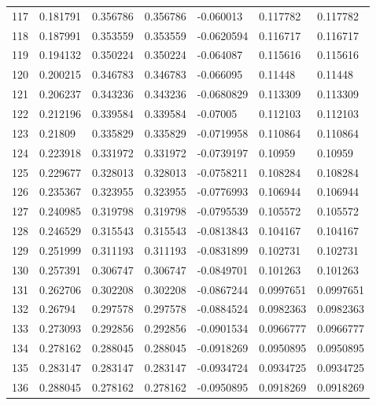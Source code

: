 \begin{longtable}{l|lll|lll}
 117 &  0.181791    & 0.356786    & 0.356786    & -0.060013    & 0.117782    & 0.117782    \\
 118 &  0.187991    & 0.353559    & 0.353559    & -0.0620594   & 0.116717    & 0.116717    \\
 119 &  0.194132    & 0.350224    & 0.350224    & -0.064087    & 0.115616    & 0.115616    \\
 120 &  0.200215    & 0.346783    & 0.346783    & -0.066095    & 0.11448     & 0.11448     \\
 121 &  0.206237    & 0.343236    & 0.343236    & -0.0680829   & 0.113309    & 0.113309    \\
 122 &  0.212196    & 0.339584    & 0.339584    & -0.07005     & 0.112103    & 0.112103    \\
 123 &  0.21809     & 0.335829    & 0.335829    & -0.0719958   & 0.110864    & 0.110864    \\
 124 &  0.223918    & 0.331972    & 0.331972    & -0.0739197   & 0.10959     & 0.10959     \\
 125 &  0.229677    & 0.328013    & 0.328013    & -0.0758211   & 0.108284    & 0.108284    \\
 126 &  0.235367    & 0.323955    & 0.323955    & -0.0776993   & 0.106944    & 0.106944    \\
 127 &  0.240985    & 0.319798    & 0.319798    & -0.0795539   & 0.105572    & 0.105572    \\
 128 &  0.246529    & 0.315543    & 0.315543    & -0.0813843   & 0.104167    & 0.104167    \\
 129 &  0.251999    & 0.311193    & 0.311193    & -0.0831899   & 0.102731    & 0.102731    \\
 130 &  0.257391    & 0.306747    & 0.306747    & -0.0849701   & 0.101263    & 0.101263    \\
 131 &  0.262706    & 0.302208    & 0.302208    & -0.0867244   & 0.0997651   & 0.0997651   \\
 132 &  0.26794     & 0.297578    & 0.297578    & -0.0884524   & 0.0982363   & 0.0982363   \\
 133 &  0.273093    & 0.292856    & 0.292856    & -0.0901534   & 0.0966777   & 0.0966777   \\
 134 &  0.278162    & 0.288045    & 0.288045    & -0.0918269   & 0.0950895   & 0.0950895   \\
 135 &  0.283147    & 0.283147    & 0.283147    & -0.0934724   & 0.0934725   & 0.0934725   \\
 136 &  0.288045    & 0.278162    & 0.278162    & -0.0950895   & 0.0918269   & 0.0918269   \\

\end{longtable}

